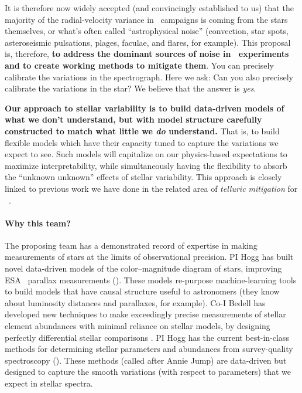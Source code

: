 \documentclass[12pt, letterpaper]{article}
\begin{document}
It is therefore now widely accepted (and convincingly
established to us) that the majority of the radial-velocity variance
in \EPRV\ campaigns is coming from the stars themselves, or what's
often called ``astrophysical noise'' (convection, star spots,
asteroseismic pulsations, plages, faculae, and flares, for example).
This proposal is, therefore, \textbf{to address the dominant sources of
  noise in \EPRV\ experiments and to create working methods to
  mitigate them}.
You can precisely calibrate the variations in the spectrograph.
Here we ask: Can you also precisely calibrate the variations in the star?
We believe that the answer is \emph{yes}.


\textbf{Our approach to stellar variability is to build data-driven models of what
we don't understand, but with model structure carefully constructed to
match what little we \emph{do} understand.}
That is, to build flexible models which have their capacity tuned to
capture the variations we expect to see. 
Such models will capitalize on our physics-based expectations to
maximize interpretability, while simultaneously having the flexibility to absorb 
the ``unknown unknown'' effects of stellar variability.
This approach is closely linked to previous work we have done in the related 
area of \textit{telluric mitigation} for \EPRV\ \citep{Bedell2019}.

\paragraph{Why this team?}
The proposing team has a demonstrated record of expertise in making
measurements of stars at the limits of observational precision. 
PI Hogg has built novel data-driven models of the color--magnitude diagram of
stars, improving ESA \Gaia\ parallax measurements (\citealt{Leistedt, Widmark, Anderson}).
These models re-purpose machine-learning tools to build models that
have causal structure useful to astronomers (they know about
luminosity distances and parallaxes, for example).
Co-I Bedell has developed new techniques to make exceedingly
precise measurements of stellar element abundances with minimal
reliance on stellar models, by designing perfectly differential stellar
comparisons \citep{Bedell2014, Bedell2018}.
PI Hogg has the current best-in-class methods for determining stellar
parameters and abundances from survey-quality spectroscopy (\citealt{Cannon2, Doppel}).
These methods (called  after Annie Jump) are
data-driven but designed to capture the smooth variations (with
respect to parameters) that we expect in stellar spectra.
\end{document}
